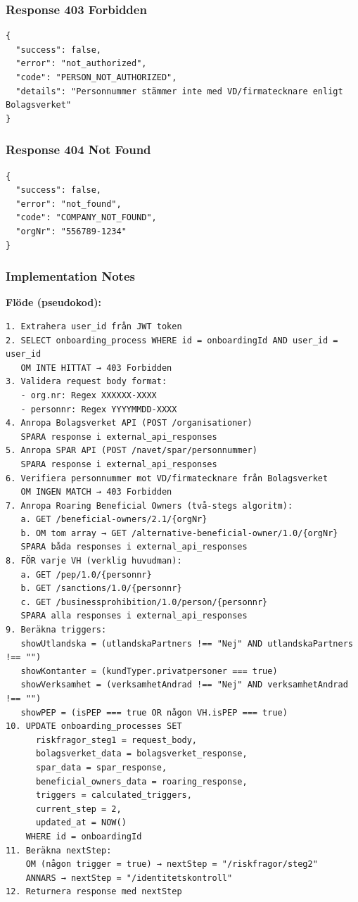\subsubsection{Response 403 Forbidden}

\begin{lstlisting}
{
  "success": false,
  "error": "not_authorized",
  "code": "PERSON_NOT_AUTHORIZED",
  "details": "Personnummer stämmer inte med VD/firmatecknare enligt Bolagsverket"
}
\end{lstlisting}

\subsubsection{Response 404 Not Found}
\begin{lstlisting}
{
  "success": false,
  "error": "not_found",
  "code": "COMPANY_NOT_FOUND",
  "orgNr": "556789-1234"
}
\end{lstlisting}

\subsubsection{Implementation Notes}

\textbf{Flöde (pseudokod):}
\begin{lstlisting}
1. Extrahera user_id från JWT token
2. SELECT onboarding_process WHERE id = onboardingId AND user_id = user_id
   OM INTE HITTAT → 403 Forbidden
3. Validera request body format:
   - org.nr: Regex XXXXXX-XXXX
   - personnr: Regex YYYYMMDD-XXXX
4. Anropa Bolagsverket API (POST /organisationer)
   SPARA response i external_api_responses
5. Anropa SPAR API (POST /navet/spar/personnummer)
   SPARA response i external_api_responses
6. Verifiera personnummer mot VD/firmatecknare från Bolagsverket
   OM INGEN MATCH → 403 Forbidden
7. Anropa Roaring Beneficial Owners (två-stegs algoritm):
   a. GET /beneficial-owners/2.1/{orgNr}
   b. OM tom array → GET /alternative-beneficial-owner/1.0/{orgNr}
   SPARA båda responses i external_api_responses
8. FÖR varje VH (verklig huvudman):
   a. GET /pep/1.0/{personnr}
   b. GET /sanctions/1.0/{personnr}
   c. GET /businessprohibition/1.0/person/{personnr}
   SPARA alla responses i external_api_responses
9. Beräkna triggers:
   showUtlandska = (utlandskaPartners !== "Nej" AND utlandskaPartners !== "")
   showKontanter = (kundTyper.privatpersoner === true)
   showVerksamhet = (verksamhetAndrad !== "Nej" AND verksamhetAndrad !== "")
   showPEP = (isPEP === true OR någon VH.isPEP === true)
10. UPDATE onboarding_processes SET 
      riskfragor_steg1 = request_body,
      bolagsverket_data = bolagsverket_response,
      spar_data = spar_response,
      beneficial_owners_data = roaring_response,
      triggers = calculated_triggers,
      current_step = 2,
      updated_at = NOW()
    WHERE id = onboardingId
11. Beräkna nextStep:
    OM (någon trigger = true) → nextStep = "/riskfragor/steg2"
    ANNARS → nextStep = "/identitetskontroll"
12. Returnera response med nextStep
\end{lstlisting}

